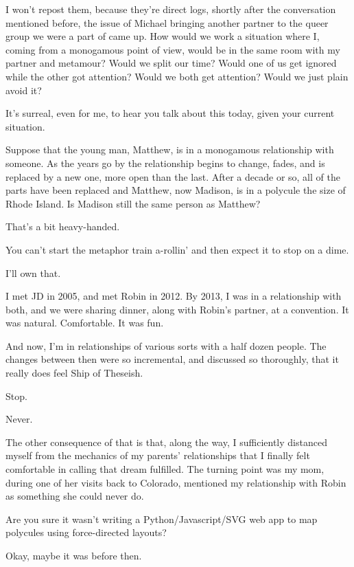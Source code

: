 \begin{leftcolumn}
I won't repost them, because they're direct logs, shortly after the conversation mentioned before, the issue of Michael bringing another partner to the queer group we were a part of came up. How would we work a situation where I, coming from a monogamous point of view, would be in the same room with my partner and metamour? Would we split our time? Would one of us get ignored while the other got attention? Would we both get attention? Would we just plain avoid it?

\begin{ally}
It's surreal, even for me, to hear you talk about this today, given your current situation.
\end{ally}
Suppose that the young man, Matthew, is in a monogamous relationship with someone. As the years go by the relationship begins to change, fades, and is replaced by a new one, more open than the last. After a decade or so, all of the parts have been replaced and Matthew, now Madison, is in a polycule the size of Rhode Island. Is Madison still the same person as Matthew?

\begin{ally}
That's a bit heavy-handed.
\end{ally}
You can't start the metaphor train a-rollin' and then expect it to stop on a dime.

\begin{ally}
I'll own that.
\end{ally}
I met JD in 2005, and met Robin in 2012. By 2013, I was in a relationship with both, and we were sharing dinner, along with Robin's partner, at a convention. It was natural. Comfortable. It was fun.

And now, I'm in relationships of various sorts with a half dozen people. The changes between then were so incremental, and discussed so thoroughly, that it really does feel Ship of Theseish.

\begin{ally}
Stop.
\end{ally}
Never.

The other consequence of that is that, along the way, I sufficiently distanced myself from the mechanics of my parents' relationships that I finally felt comfortable in calling that dream fulfilled. The turning point was my mom, during one of her visits back to Colorado, mentioned my relationship with Robin as something she could never do.

\begin{ally}
Are you sure it wasn't writing a Python/Javascript/SVG web app to map polycules using force-directed layouts?
\end{ally}
Okay, maybe it was before then.


\end{leftcolumn}
